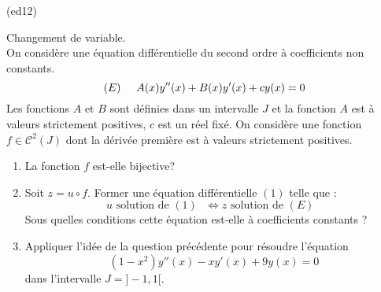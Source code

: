 \begin{tiny}(ed12)\end{tiny} Changement de variable.\\
On considère une équation différentielle du second ordre à coefficients non constants.
\begin{displaymath}
 (E)\hspace{0.5cm}A(x)y''(x)+B(x)y'(x)+cy(x) = 0
\end{displaymath}
Les fonctions $A$ et $B$ sont définies dans un intervalle $J$ et la fonction $A$ est à valeurs strictement positives, $c$ est un réel fixé. On considère une fonction $f\in \mathcal C^2(J)$ dont la dérivée première est à valeurs strictement positives.
\begin{enumerate}
\item La fonction $f$ est-elle bijective?
 \item Soit $z = u\circ f$. Former une équation différentielle $(1)$ telle que :
 \begin{displaymath}
   u \text{ solution de $(1)$ } \Leftrightarrow z \text{ solution de $(E)$ }
 \end{displaymath}
Sous quelles conditions cette équation est-elle à coefficients constants ?
 \item Appliquer l'idée de la question précédente pour résoudre l'équation
\begin{displaymath}
 (1-x^2)y''(x)-xy'(x)+9y(x) = 0
\end{displaymath}
dans l'intervalle $J=]-1,1[$.
\end{enumerate}
 
